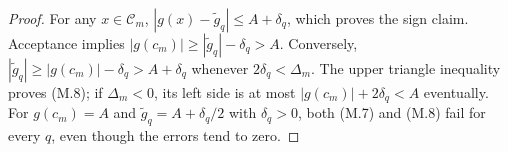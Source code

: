 \begin{proof}
For any $x\in\mathcal C_m$, $|g(x)-\widetilde g_q|\le A+\delta_q$,
which proves the sign claim. Acceptance implies
$|g(c_m)|\ge|\widetilde g_q|-\delta_q>A$. Conversely,
$|\widetilde g_q|\ge|g(c_m)|-\delta_q>A+\delta_q$ whenever
$2\delta_q<\Delta_m$. The upper triangle inequality proves (M.8);
if $\Delta_m<0$, its left side is at most $|g(c_m)|+2\delta_q<A$
eventually. For $g(c_m)=A$ and
$\widetilde g_q=A+\delta_q/2$ with $\delta_q>0$, both (M.7) and (M.8)
fail for every $q$, even though the errors tend to zero.
\end{proof}
